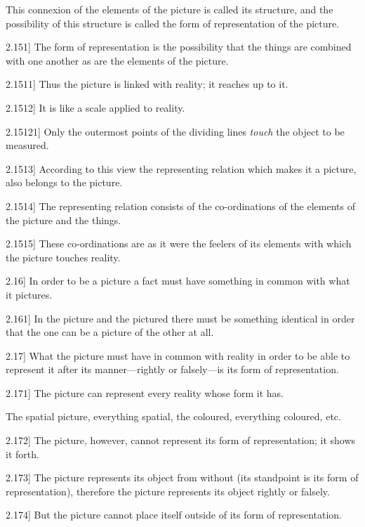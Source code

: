 \documentclass[12pt,oneside]{book}[2007/10/19]
\newcommand{\PropositionE}[2]{%
  \item[\phantomsection\label{PropE:#1}\PropGRef{#1}] #2%
}
\newcommand{\PropGRef}[1]{\hyperref[PropG:#1]{#1}}
\begin{document}
\begin{propositions}
{This connexion of the elements of the picture is
called its structure, and the possibility of this structure
is called the form of representation of the picture.}


\PropositionE{2.151}
{The form of representation is the possibility that
the things are combined with one another as are
the elements of the picture.}


\PropositionE{2.1511}
{Thus the picture is linked with reality; it reaches
up to it.}


\PropositionE{2.1512}
{It is like a scale applied to reality.}


\PropositionE{2.15121}
{Only the outermost points of the dividing lines
\emph{touch} the object to be measured.}


\PropositionE{2.1513}
{According to this view the representing relation
which makes it a picture, also belongs to the
picture.}


\PropositionE{2.1514}
{The representing relation consists of the co-ordinations
of the elements of the picture and the
things.}


\PropositionE{2.1515}
{These co-ordinations are as it were the feelers of
its elements with which the picture touches
reality.}


\PropositionE{2.16}
{In order to be a picture a fact must have something
in common with what it pictures.}


\PropositionE{2.161}
{In the picture and the pictured there must be
something identical in order that the one can be a
picture of the other at all.}


\PropositionE{2.17}
{What the picture must have in common with
reality in order to be able to represent it after its
manner---rightly or falsely---is its form of representation.}


\PropositionE{2.171}
{The picture can represent every reality whose
form it has.

The spatial picture, everything spatial, the
coloured, everything coloured, etc.}


\PropositionE{2.172}
{The picture, however, cannot represent its form
of representation; it shows it forth.}


\PropositionE{2.173}
{The picture represents its object from without
(its standpoint is its form of representation), therefore
the picture represents its object rightly or
falsely.}


\PropositionE{2.174}
{But the picture cannot place itself outside of its
form of representation.}



\end{propositions}
\end{document}
